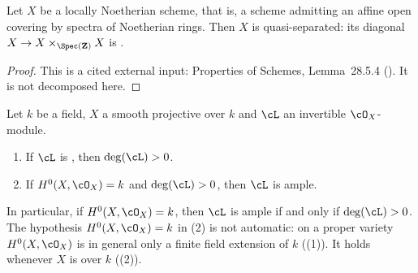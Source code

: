 \begin{lemma}
\label{lem:pc-locally-noetherian-quasi-separated}
Let $X$ be a locally Noetherian scheme, that is, a scheme admitting an
affine open covering by spectra of Noetherian rings.  Then $X$ is
quasi-separated: its diagonal $X\to X\times_{\Spec(\mathbf Z)}X$ is
.
\end{lemma}
\begin{proof}
This is a cited external input: Properties of Schemes, Lemma~28.5.4
().  It is not decomposed here.
\end{proof}

\begin{lemma}
\label{lem:pc-ample-positive-degree}
Let $k$ be a field, $X$ a smooth projective
 over $k$ and $\cL$ an invertible
$\cO_X$-module.
\begin{enumerate}
\item If $\cL$ is , then $\deg(\cL)>0$.
\item If $H^0(X,\cO_X)=k$ and $\deg(\cL)>0$, then $\cL$ is ample.
\end{enumerate}
In particular, if $H^0(X,\cO_X)=k$, then $\cL$ is ample if and only if
$\deg(\cL)>0$.  The hypothesis $H^0(X,\cO_X)=k$ in (2) is not
automatic: on a proper variety $H^0(X,\cO_X)$ is in general only a
finite field extension of $k$ ((1)).  It
holds whenever $X$ is
over $k$ ((2)).
\end{lemma}
